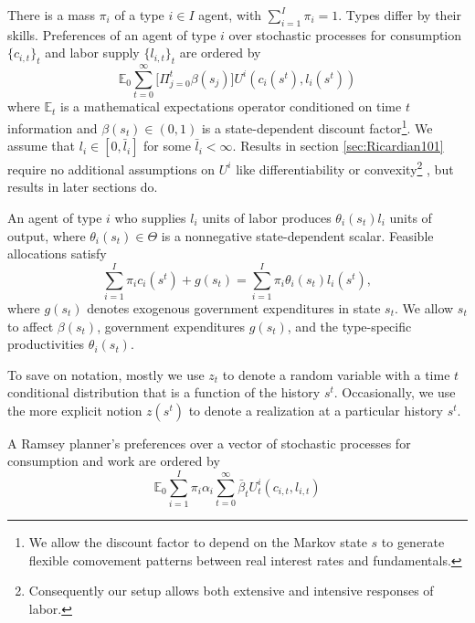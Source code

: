\documentclass[thmsb,11pt]{article}
\begin{document}
There is a mass $\pi _{i}$
of a type $i\in I$ agent, with $\sum_{i=1}^{I}\pi _{i}=1.$ Types differ by their skills.
Preferences of an
agent of type $i$ over stochastic processes for consumption $\{c_{i,t}\}_t$
and labor supply $\{l_{i,t}\}_t$ are ordered by
\begin{equation}
\mathbb{E}_{0}\sum_{t=0}^{\infty } \bigl[\Pi_{j=0}^t \beta(s_j)\bigr] U^{i}\left(
c_{i}(s^t),l_{i}(s^t)\right)  \label{utility lifetime}
\end{equation}%
where $\mathbb{E}_{t}$ is a mathematical expectations operator conditioned
on time $t$ information and $\beta(s_t) \in \left( 0,1\right) $ is a state-dependent discount
factor\footnote{We allow the discount factor to depend on the Markov state $s$ to generate flexible  comovement patterns between real interest rates and fundamentals. }. We assume that $l_{i}\in \left[ 0,\bar{l}_{i}\right] $ for some $%
\bar{l}_{i}<\infty .$ Results in section  \ref{sec:Ricardian101} require no
additional assumptions on $U^{i}$ like  differentiability or convexity\footnote{Consequently  our setup allows both extensive and intensive responses of labor.} , but results in later sections do.

An agent of type $i$ who supplies $l_{i}$ units of labor produces $\theta
_{i}\left( s_t\right) l_{i}$ units of output, where $\theta _{i}(s_t)\in \Theta $
is a nonnegative state-dependent scalar. Feasible allocations satisfy
\begin{equation}%
\sum_{i=1}^{I}\pi_{i}c_{i}(s^t)+g\left( s_{t}\right) =\sum_{i=1}^{I}\pi
_{i}\theta _{i}\left( s_{t}\right) l_{i}(s^t),  \label{feasibility goods}
\end{equation}%
where $g\left( s_{t}\right) $ denotes exogenous government expenditures in
state $s_{t}.$
 We allow $s_t$ to
affect $\beta(s_t)$, government expenditures $g(s_t)$, and the type-specific productivities $\theta_i(s_t)$.

To save on notation, mostly we
use $z_{t}$ to denote a random variable with a time $t$ conditional
distribution that is a function of the history $s^{t}$.
 Occasionally, we use the more explicit notion $z\left(
s^{t}\right) $ to denote a realization  at
a particular history $s^{t}.$


A Ramsey  planner's preferences over a vector of stochastic processes for consumption and
work are ordered by
\begin{equation}
\mathbb{E}_{0}\sum_{i=1}^{I}\pi _{i}\alpha _{i}\sum_{t=0}^{\infty }\bar{\beta}_t U_{t}^{i}\left( c_{i,t},l_{i,t}\right)  \label{govmt objective}
\end{equation}
\end{document}
